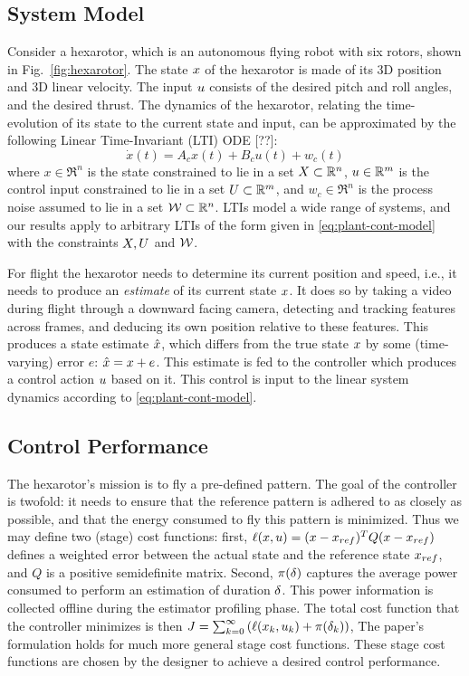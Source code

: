 \subsection{System Model}
\label{formulation}

Consider a hexarotor, which is an autonomous flying robot with six rotors, shown in Fig.~\ref{fig:hexarotor}.
The state $x$ of the hexarotor is made of its 3D position and 3D linear velocity.
The input $u$ consists of the desired pitch and roll angles, and the desired thrust.
The dynamics of the hexarotor, relating the time-evolution of its state to the current state and input, can be approximated by the following Linear Time-Invariant (LTI) ODE [??]:
\begin{equation}
\dot{x}(t) = A_{c}x(t)+B_{c}u(t)+w_{c}(t)  \label{eq:plant-cont-model}
\end{equation}
where $x\in \Re^{n}$ is the state constrained to lie in a set $X \subset \mathbb{R}^n$, 
$u\in\mathbb{R}^{m}$ is the control input constrained to lie in a set $U \subset \mathbb{R}^m$,
and $w_{c}\in\Re^{n}$ is the process noise assumed to lie in a set $\mathcal{W} \subset \mathbb{R}^n$. 
LTIs model a wide range of systems, and our results apply to arbitrary LTIs of the form given in \eqref{eq:plant-cont-model} with the constraints $X,U$ and $\mathcal{W}$.

For flight the hexarotor needs to determine its current position and speed, i.e., it needs to produce an \emph{estimate} of its current state $x$.
It does so by taking a video during flight through a downward facing camera, detecting and tracking features across frames, and deducing its own position relative to these features.
This produces a state estimate $\hat{x}$, which differs from the true state $x$ by some (time-varying) error $e$: $\hat{x} = x + e$.
This estimate is fed to the controller which produces a control action $u$ based on it.
This control is input to the linear system dynamics according to \eqref{eq:plant-cont-model}.

\subsection{Control Performance}
The hexarotor's mission is to fly a pre-defined pattern. 
The goal of the controller is twofold: it needs to ensure that the reference pattern is adhered to as closely as possible, and that the energy consumed to fly this pattern is minimized.
Thus we may define two (stage) cost functions: first, $\ell(x, u) = (x - x_{ref})^TQ(x - x_{ref})$ defines a weighted error between the actual state and the reference state $x_{ref}$, and $Q$ is a positive semidefinite matrix.
Second, $\pi(\delta)$ captures the average power consumed to perform an estimation of duration $\delta$. 
This power information is collected offline during the estimator profiling phase.
The total cost function that the controller minimizes is then
\(
J=\sum_{k=0}^{\infty}\left(\ell(x_{k},u_{k})+\pi(\delta_k)\right)
\),
The paper's formulation holds for much more general stage cost functions.
These stage cost functions are chosen by the designer to achieve a desired control performance.


